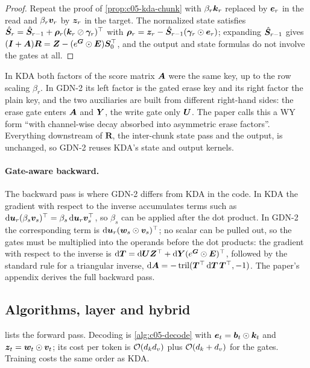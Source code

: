 \begin{proof}
Repeat the proof of \cref{prop:c05-kda-chunk} with $\beta_r\bm{k}_r$ replaced by $\bm{e}_r$ in the read
and $\beta_r\bm{v}_r$ by $\bm{z}_r$ in the target. The normalized state satisfies
$\hat{\bm{S}}_r = \hat{\bm{S}}_{r-1} + \bm\rho_r(\bm{k}_r\oslash\bm\gamma_r)^{\top}$ with
$\bm\rho_r = \bm{z}_r - \hat{\bm{S}}_{r-1}(\bm\gamma_r\odot\bm{e}_r)$; expanding $\hat{\bm{S}}_{r-1}$ gives
$(\bm{I} + \bm{A})\bm R = \bm{Z} - (e^{\bm{G}}\odot\bm E)\bm{S}_0^{\top}$, and the output and state formulas do not
involve the gates at all.
\end{proof}

In KDA both factors of the score matrix $\bm{A}$ were the same key, up to the row scaling $\beta_r$. In
GDN-2 its left factor is the gated erase key and its right factor the plain key, and the two auxiliaries are
built from different right-hand sides: the erase gate enters $\bm{A}$ and $\bm{Y}$, the write gate only
$\bm{U}$. The paper calls this a WY form ``with channel-wise decay absorbed into asymmetric erase
factors''. Everything downstream of $\bm R$, the inter-chunk state pass and the output, is
unchanged, so GDN-2 reuses KDA's state and output kernels.

\paragraph{Gate-aware backward.} The backward pass is where GDN-2 differs from KDA in the code. In
KDA the gradient with respect to the inverse accumulates terms such as
$\mathrm{d}\bm{u}_r(\beta_s\bm{v}_s)^{\top} = \beta_s\,\mathrm{d}\bm{u}_r\bm{v}_s^{\top}$, so $\beta_s$ can be applied
after the dot product. In GDN-2 the corresponding term is $\mathrm{d}\bm{u}_r(\bm{w}_s\odot\bm{v}_s)^{\top}$; no
scalar can be pulled out, so the gates must be multiplied into the operands before the dot
products: the gradient with respect to the inverse is
$\mathrm{d}\bm{T} = \mathrm{d}\bm{U}\bm{Z}^{\top} + \mathrm{d}\bm{Y}(e^{\bm{G}}\odot\bm E)^{\top}$, followed by the standard
rule for a triangular inverse,
$\mathrm{d}\bm{A} = -\operatorname{tril}(\bm{T}^{\top}\,\mathrm{d}\bm{T}\,\bm{T}^{\top}, -1)$. The paper's appendix
derives the full backward pass.

\subsection{Algorithms, layer and hybrid}\label{sec:c05-gdn2-alg}

 lists the forward pass. Decoding is \cref{alg:c05-decode} with
$\bm{e}_t = \bm{b}_t\odot\bm{k}_t$ and $\bm{z}_t = \bm{w}_t\odot\bm{v}_t$; its cost per token is $\mathcal{O}(d_kd_v)$ plus
$\mathcal{O}(d_k + d_v)$ for the gates. Training costs the same order as KDA.

